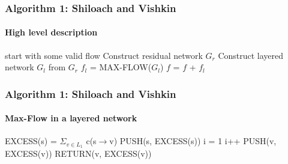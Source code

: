 \documentclass{beamer}
\begin{document}
\begin{frame}
\frametitle{Algorithm 1: Shiloach and Vishkin}
\framesubtitle{High level description}
	\begin{algorithmic}[1]
	\State start with some valid flow 
	 \Comment{\textcolor{OliveGreen}{$O(n)$}}	
		\State Construct residual network $G_r$ \Comment{\textcolor{OliveGreen}{$O(n)$, $p=O(n)$}}
		\State Construct layered network $G_l$ from $G_r$ 
		\State $f_l$ = MAX-FLOW($G_l$)  
		\State $f$ = $f$ + $f_l$ \Comment{\textcolor{OliveGreen}{$O(n)$}}
	\EndWhile
	\EndFunction
	\end{algorithmic}
\end{frame}

\begin{frame}
\frametitle{Algorithm 1: Shiloach and Vishkin}
\framesubtitle{Max-Flow in a layered network}	
	\begin{algorithmic}[1]
		\State EXCESS(s) = $\Sigma_{v \in L_1}$ c(s$\rightarrow$v)
		\State PUSH(s, EXCESS(s))
		\State i = 1
			\State i++
				\State PUSH(v, EXCESS(v))
			\EndIf
			\State RETURN(v, EXCESS(v))
		\EndWhile
	
	\EndFunction
	\end{algorithmic}
\end{frame}
\end{document}
